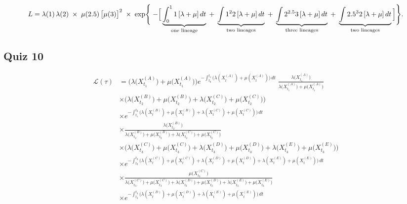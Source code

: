 \documentclass[11pt, headings=standardclasses, parskip=half, twoside]{scrartcl}
\begin{document}
\[
L
= \lambda(1)\,\lambda(2)\;\times\;\mu(2.5)\,\bigl[\mu(3)\bigr]^2
\;\times\;
\exp\Biggl\{\;-\Bigl[\,
\underbrace{\int_{0}^{1}1\,[\lambda+\mu]\,dt}_{\text{one lineage}}
\;+\;\underbrace{\int{1}^{2}2\,[\lambda+\mu]\,dt}_{\text{two lineages}}
\;+\;\underbrace{\int{2}^{2.5}3\,[\lambda+\mu]\,dt}_{\text{three lineages}}
\;+\;\underbrace{\int{2.5}^{3}2\,[\lambda+\mu]\,dt}_{\text{two lineages}}
\,\Bigr]\Biggr\}.
\]



\subsection{Quiz 10}

\begin{align*}
\mathcal{L}(\tau)
&=
\bigl(\lambda\bigl(X^{(A)}_{t_1}\bigr)+\mu\bigl(X^{(A)}_{t_1}\bigr)\bigr)
e^{-\!\!\int_{t_0}^{t_1}\!\!\bigl(\lambda(X^{(A)}_t)+\mu(X^{(A)}_t)\bigr)\,dt}
\;\frac{\lambda\bigl(X^{(A)}_{t_1}\bigr)}
      {\lambda\bigl(X^{(A)}_{t_1}\bigr)+\mu\bigl(X^{(A)}_{t_1}\bigr)}
\\
&\times
\bigl(\lambda\bigl(X^{(B)}_{t_2}\bigr)+\mu\bigl(X^{(B)}_{t_2}\bigr)
     +\lambda\bigl(X^{(C)}_{t_2}\bigr)+\mu\bigl(X^{(C)}_{t_2}\bigr)\bigr)
\\
&\times
     e^{-\!\!\int_{t_1}^{t_2}\!\!\bigl(\lambda(X^{(B)}_t)+\mu(X^{(B)}_t)
+\lambda(X^{(C)}_t)+\mu(X^{(C)}_t)\bigr)\,dt}
\\
&\times
\frac{\lambda\bigl(X^{(B)}_{t_2}\bigr)}
      {\lambda\bigl(X^{(B)}_{t_2}\bigr)+\mu\bigl(X^{(B)}_{t_2}\bigr)
       +\lambda\bigl(X^{(C)}_{t_2}\bigr)+\mu\bigl(X^{(C)}_{t_2}\bigr)}
\\
&\times
\bigl(\lambda\bigl(X^{(C)}_{t_3}\bigr)+\mu\bigl(X^{(C)}_{t_3}\bigr)
     +\lambda\bigl(X^{(D)}_{t_3}\bigr)+\mu\bigl(X^{(D)}_{t_3}\bigr)
     +\lambda\bigl(X^{(E)}_{t_3}\bigr)+\mu\bigl(X^{(E)}_{t_3}\bigr)\bigr)
\\
&\times
     e^{-\!\!\int_{t_2}^{t_3}\!\!\bigl(\lambda(X^{(C)}_t)+\mu(X^{(C)}_t)
+\lambda(X^{(D)}_t)+\mu(X^{(D)}_t)
+\lambda(X^{(E)}_t)+\mu(X^{(E)}_t)\bigr)\,dt}
\\
&
\times
\frac{\mu\bigl(X^{(C)}_{t_3}\bigr)}
     {\lambda\bigl(X^{(C)}_{t_3}\bigr)+\mu\bigl(X^{(C)}_{t_3}\bigr)
      +\lambda\bigl(X^{(D)}_{t_3}\bigr)+\mu\bigl(X^{(D)}_{t_3}\bigr)
      +\lambda\bigl(X^{(E)}_{t_3}\bigr)+\mu\bigl(X^{(E)}_{t_3}\bigr)}
\\
&\times
e^{-\!\!\int_{t_3}^{t_4}\!\!\bigl(\lambda(X^{(D)}_t)+\mu(X^{(D)}_t)
+\lambda(X^{(E)}_t)+\mu(X^{(E)}_t)\bigr)\,dt}
\end{align*}
\end{document}
